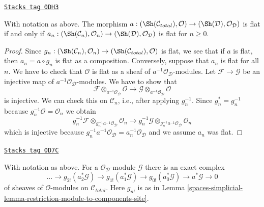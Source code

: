 \begin{lemma}
\label{spaces-simplicial-lemma-flat-augmentation-modules}
\href{https://stacks.math.columbia.edu/tag/0DH3}{\texttt{Stacks tag 0DH3}}

With notation as above. The morphism
$a : (\Sh(\mathcal{C}_{total}), \mathcal{O}) \to
(\Sh(\mathcal{D}), \mathcal{O}_\mathcal{D})$
is flat if and only if
$a_n : (\Sh(\mathcal{C}_n), \mathcal{O}_n) \to
(\Sh(\mathcal{D}), \mathcal{O}_\mathcal{D})$
is flat for $n \geq 0$.
\end{lemma}

\begin{proof}
Since $g_n : (\Sh(\mathcal{C}_n), \mathcal{O}_n) \to
(\Sh(\mathcal{C}_{total}), \mathcal{O})$ is flat, we see
that if $a$ is flat, then $a_n = a \circ g_n$ is flat as
a composition. Conversely, suppose that $a_n$ is flat for all $n$.
We have to check that $\mathcal{O}$ is flat as a sheaf of
$a^{-1}\mathcal{O}_\mathcal{D}$-modules. Let $\mathcal{F} \to \mathcal{G}$
be an injective map of $a^{-1}\mathcal{O}_\mathcal{D}$-modules.
We have to show that
$$
\mathcal{F} \otimes_{a^{-1}\mathcal{O}_\mathcal{D}} \mathcal{O}
\to
\mathcal{G} \otimes_{a^{-1}\mathcal{O}_\mathcal{D}} \mathcal{O}
$$
is injective. We can check this on $\mathcal{C}_n$, i.e., after
applying $g_n^{-1}$. Since $g_n^* = g_n^{-1}$ because
$g_n^{-1}\mathcal{O} = \mathcal{O}_n$ we obtain
$$
g_n^{-1}\mathcal{F} \otimes_{g_n^{-1}a^{-1}\mathcal{O}_\mathcal{D}}
\mathcal{O}_n
\to
g_n^{-1}\mathcal{G} \otimes_{g_n^{-1}a^{-1}\mathcal{O}_\mathcal{D}}
\mathcal{O}_n
$$
which is injective because
$g_n^{-1}a^{-1}\mathcal{O}_\mathcal{D} = a_n^{-1}\mathcal{O}_\mathcal{D}$
and we assume $a_n$ was flat.
\end{proof}

\begin{lemma}
\label{spaces-simplicial-lemma-simplicial-resolution-augmentation-modules}
\href{https://stacks.math.columbia.edu/tag/0D7C}{\texttt{Stacks tag 0D7C}}

With notation as above. For a $\mathcal{O}_\mathcal{D}$-module $\mathcal{G}$
there is an exact complex
$$
\ldots \to
g_{2!}(a_2^*\mathcal{G}) \to
g_{1!}(a_1^*\mathcal{G}) \to
g_{0!}(a_0^*\mathcal{G}) \to
a^*\mathcal{G} \to 0
$$
of sheaves of $\mathcal{O}$-modules on $\mathcal{C}_{total}$.
Here $g_{n!}$ is as in Lemma \ref{spaces-simplicial-lemma-restriction-module-to-components-site}.
\end{lemma}

